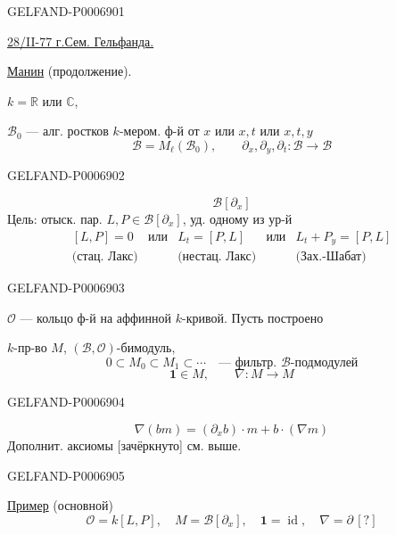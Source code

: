 \begin{GelfandAdjacentEvidence}{GELFAND-P000690}{1}

\underline{28/II-77 г.}\qquad\underline{Сем. Гельфанда.}

\underline{Манин} (продолжение).

\(k=\mathbb R\) или \(\mathbb C\),

\(\mathcal B_0\) --- алг. ростков \(k\)-мером. ф-й от \(x\) или \(x,t\)
или \(x,t,y\)
\[
\mathcal B=M_\ell(\mathcal B_0),\qquad
\partial_x,\partial_y,\partial_t:\mathcal B\to\mathcal B
\]
\end{GelfandAdjacentEvidence}
\begin{GelfandAdjacentEvidence}{GELFAND-P000690}{2}

\[
\mathcal B[\partial_x]
\]
Цель: отыск. пар. \(L,P\in\mathcal B[\partial_x]\), уд. одному из ур-й
\[
\begin{array}{ccccc}
[L,P]=0&\text{или}&L_t=[P,L]&\text{или}&L_t+P_y=[P,L]\\
\text{(стац. Лакс)}&&\text{(нестац. Лакс)}&&\text{(Зах.-Шабат)}
\end{array}
\]
\end{GelfandAdjacentEvidence}
\begin{GelfandAdjacentEvidence}{GELFAND-P000690}{3}

\(\mathcal O\) --- кольцо ф-й на аффинной \(k\)-кривой. Пусть построено

\(k\)-пр-во \(M\), \((\mathcal B,\mathcal O)\)-бимодуль,
\[
0\subset M_0\subset M_1\subset\cdots
\quad\text{--- фильтр. }\mathcal B\text{-подмодулей}
\]
\[
\mathbf1\in M,\qquad \nabla:M\to M
\]
\end{GelfandAdjacentEvidence}
\begin{GelfandAdjacentEvidence}{GELFAND-P000690}{4}

\[
\nabla(bm)=(\partial_x b)\cdot m+b\cdot(\nabla m)
\]
Дополнит. аксиомы [зачёркнуто] см. выше.
\end{GelfandAdjacentEvidence}
\begin{GelfandAdjacentEvidence}{GELFAND-P000690}{5}


\underline{Пример} (основной)
\[
\mathcal O=k[L,P],\quad M=\mathcal B[\partial_x],\quad
\mathbf1=\operatorname{id},\quad\nabla=\partial\,[?]
\]
\end{GelfandAdjacentEvidence}
